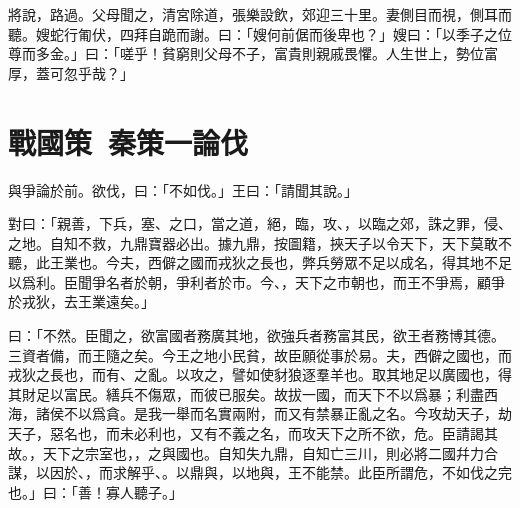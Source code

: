 將說，路過。父母聞之，清宮除道，張樂設飲，郊迎三十里。妻側目而視，側耳而聽。嫂蛇行匍伏，四拜自跪而謝。曰：「嫂何前倨而後卑也？」嫂曰：「以季子之位尊而多金。」曰：「嗟乎！貧窮則父母不子，富貴則親戚畏懼。人生世上，勢位富厚，蓋可忽乎哉？」

\section[司馬錯論伐蜀\quad{\small 戰國策 秦策一}]{{\normalsize 戰國策\ 秦策一}\quad {}論伐}
與爭論於前。欲伐，曰：「不如伐。」王曰：「請聞其說。」

對曰：「親善，下兵，塞、之口，當之道，絕，臨，攻、，以臨之郊，誅之罪，侵、之地。自知不救，九鼎寶器必出。據九鼎，按圖籍，挾天子以令天下，天下莫敢不聽，此王業也。今夫，西僻之國而戎狄之長也，弊兵勞眾不足以成名，得其地不足以爲利。臣聞爭名者於朝，爭利者於市。今、，天下之市朝也，而王不爭焉，顧爭於戎狄，去王業遠矣。」

曰：「不然。臣聞之，欲富國者務廣其地，欲強兵者務富其民，欲王者務博其德。三資者備，而王隨之矣。今王之地小民貧，故臣願從事於易。夫，西僻之國也，而戎狄之長也，而有、之亂。以攻之，譬如使豺狼逐羣羊也。取其地足以廣國也，得其財足以富民。繕兵不傷眾，而彼已服矣。故拔一國，而天下不以爲暴；利盡西海，諸侯不以爲貪。是我一舉而名實兩附，而又有禁暴正亂之名。今攻劫天子，劫天子，惡名也，而未必利也，又有不義之名，而攻天下之所不欲，危。臣請謁其故。，天下之宗室也，，之與國也。自知失九鼎，自知亡三川，則必將二國幷力合謀，以因於、，而求解乎、。以鼎與，以地與，王不能禁。此臣所謂危，不如伐之完也。」曰：「善！寡人聽子。」

